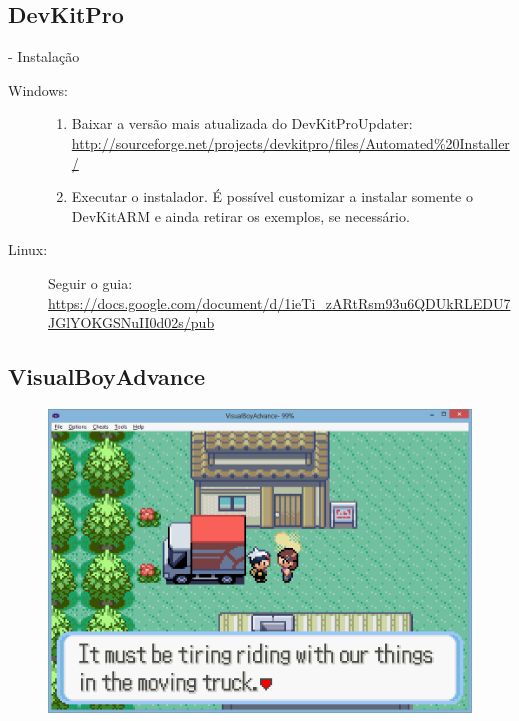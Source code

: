 \documentclass{beamer}
\begin{document}
\begin{darkframes}
\subsection{DevKitPro}

\begin{frame}{\subsecname - Instalação}
    \begin{description}
        \item[Windows:]
            \begin{enumerate}
                \item Baixar a versão mais atualizada do DevKitProUpdater:
                    \url{http://sourceforge.net/projects/devkitpro/files/Automated\%20Installer/}
                \item Executar o instalador. É possível customizar a instalar
                    somente o DevKitARM e ainda retirar os exemplos, se
                    necessário.
            \end{enumerate}
        \item[Linux:]
            Seguir o guia:
            \url{https://docs.google.com/document/d/1ieTi_zARtRsm93u6QDUkRLEDU7JGlYOKGSNuII0d02s/pub}
    \end{description}
\end{frame}

\subsection{VisualBoyAdvance}

\begin{frame}{\subsecname}
    \begin{figure}
        \centering
        \includegraphics[width=1\textwidth,height=0.5\textheight,keepaspectratio]{game_example}
    \end{figure}
\end{frame}


\end{darkframes}
\end{document}
